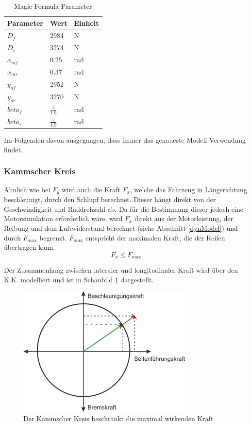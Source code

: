 \documentclass{like}
\begin{document}
\begin{table}[]
	\centering
	\caption{Magic Formula Parameter}
	\begin{tabular}{l|l|l}
		\hline
		Parameter	&  Wert  & Einheit \\ \hline
		\(D_f\)		&  2984 & N \\
		\(D_r\)		&  3274 & N \\
		\(x_{mf}\)	&  0.25 & rad \\
		\(x_{mr}\)	&  0.37 & rad \\
		\(y_{af}\)	&  2952 & N \\
 		\(y_{ar}\)	&  3270 & N \\
		\(beta_{f}\)	&  $\frac{\pi}{1.9}$ & rad \\
		\(beta_{r}\)	&  $\frac{\pi}{1.9}$ & rad \\
		
	\end{tabular}
	
	\label{tireParam}
\end{table}

Im Folgenden davon ausgegangen, dass immer das genaueste Modell Verwendung findet.



\subsubsection*{Kammscher Kreis}

Ähnlich wie bei \(F_y\) wird auch die Kraft \(F_x\), welche das Fahrzeug in Längsrichtung beschleunigt, durch den Schlupf berechnet. Dieser hängt direkt von der Geschwindigkeit und Raddrehzahl ab. Da für die Bestimmung dieser jedoch eine Motorsimulation er\-for\-der\-lich wäre, wird \(F_x\) direkt aus der Motorleistung, der Reibung und dem Luftwiderstand berechnet (siehe Abschnitt \ref{dynModel}) und durch \(F_{max}\) begrenzt. \(F_{max}\) entspricht der maximalen Kraft, die der Reifen übertragen kann.\\
\begin{equation}
F_x \leq F_{max}
\end{equation}

Der Zusammenhang zwischen lateraler und longitudinaler Kraft wird über den \ac{K.K.} modelliert und ist in Schaubild \ref{fig:kamKreis} dargestellt. 

\begin{figure}[ht!]
	\centering
	\includegraphics[width=250pt]{Abbildungen/kamKreis.png}
	\caption{Der Kammscher Kreis beschränkt die maximal wirkenden Kraft}
	\label{fig:kamKreis}
\end{figure}
\end{document}
